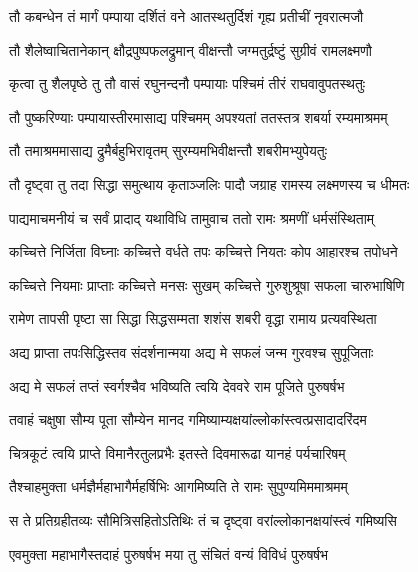 
\twolineshloka
{तौ कबन्धेन तं मार्गं पम्पाया दर्शितं वने}
{आतस्थतुर्दिशं गृह्य प्रतीचीं नृवरात्मजौ} %

\twolineshloka
{तौ शैलेष्वाचितानेकान् क्षौद्रपुष्पफलद्रुमान्}
{वीक्षन्तौ जग्मतुर्द्रष्टुं सुग्रीवं रामलक्ष्मणौ} %

\twolineshloka
{कृत्वा तु शैलपृष्ठे तु तौ वासं रघुनन्दनौ}
{पम्पायाः पश्चिमं तीरं राघवावुपतस्थतुः} %

\twolineshloka
{तौ पुष्करिण्याः पम्पायास्तीरमासाद्य पश्चिमम्}
{अपश्यतां ततस्तत्र शबर्या रम्यमाश्रमम्} %

\twolineshloka
{तौ तमाश्रममासाद्य द्रुमैर्बहुभिरावृतम्}
{सुरम्यमभिवीक्षन्तौ शबरीमभ्युपेयतुः} %

\twolineshloka
{तौ दृष्ट्वा तु तदा सिद्धा समुत्थाय कृताञ्जलिः}
{पादौ जग्राह रामस्य लक्ष्मणस्य च धीमतः} %

\twolineshloka
{पाद्यमाचमनीयं च सर्वं प्रादाद् यथाविधि}
{तामुवाच ततो रामः श्रमणीं धर्मसंस्थिताम्} %

\twolineshloka
{कच्चित्ते निर्जिता विघ्नाः कच्चित्ते वर्धते तपः}
{कच्चित्ते नियतः कोप आहारश्च तपोधने} %

\twolineshloka
{कच्चित्ते नियमाः प्राप्ताः कच्चित्ते मनसः सुखम्}
{कच्चित्ते गुरुशुश्रूषा सफला चारुभाषिणि} %

\twolineshloka
{रामेण तापसी पृष्टा सा सिद्धा सिद्धसम्मता}
{शशंस शबरी वृद्धा रामाय प्रत्यवस्थिता} %

\twolineshloka
{अद्य प्राप्ता तपःसिद्धिस्तव संदर्शनान्मया}
{अद्य मे सफलं जन्म गुरवश्च सुपूजिताः} %

\twolineshloka
{अद्य मे सफलं तप्तं स्वर्गश्चैव भविष्यति}
{त्वयि देववरे राम पूजिते पुरुषर्षभ} %

\twolineshloka
{तवाहं चक्षुषा सौम्य पूता सौम्येन मानद}
{गमिष्याम्यक्षयांल्लोकांस्त्वत्प्रसादादरिंदम} %

\twolineshloka
{चित्रकूटं त्वयि प्राप्ते विमानैरतुलप्रभैः}
{इतस्ते दिवमारूढा यानहं पर्यचारिषम्} %

\twolineshloka
{तैश्चाहमुक्ता धर्मज्ञैर्महाभागैर्महर्षिभिः}
{आगमिष्यति ते रामः सुपुण्यमिममाश्रमम्} %

\twolineshloka
{स ते प्रतिग्रहीतव्यः सौमित्रिसहितोऽतिथिः}
{तं च दृष्ट्वा वरांल्लोकानक्षयांस्त्वं गमिष्यसि} %

\twolineshloka
{एवमुक्ता महाभागैस्तदाहं पुरुषर्षभ}
{मया तु संचितं वन्यं विविधं पुरुषर्षभ} %

